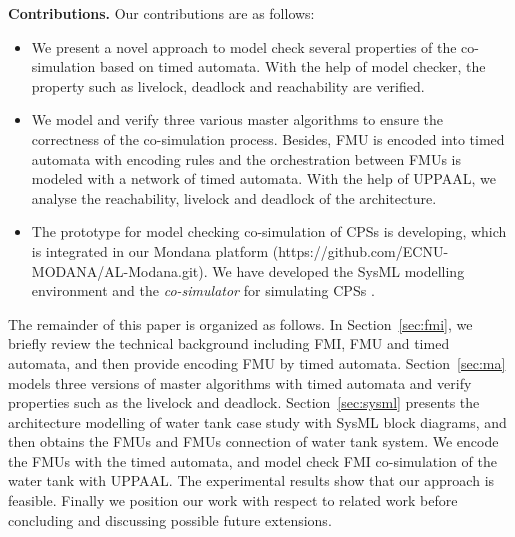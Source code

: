 \textbf{Contributions.} Our contributions are as follows:
\begin{itemize}
\item
We present a novel approach to model check several properties of the co-simulation based on timed automata. With the help of model checker, the property such as livelock, deadlock and reachability are verified. 
\item
We model and verify three various master algorithms to ensure the correctness of the co-simulation process. Besides, FMU is encoded into timed automata with encoding rules and the orchestration between FMUs is modeled with a network of timed automata. With the help of UPPAAL, we analyse the reachability, livelock and deadlock of the architecture.

\item
The prototype for model checking co-simulation of CPSs is developing, which is integrated in our Mondana platform \cite{Cheng2015Modana}(https://github.com/ECNU-MODANA/AL-Modana.git). We have developed the SysML modelling environment and the \textit{co-simulator} for simulating CPSs \cite{Fritzson1998Modelica}.
\end{itemize}
The remainder of this paper is organized as follows. In Section~\ref{sec:fmi}, we briefly review the technical background including FMI, FMU and timed automata, and then provide encoding FMU by timed automata.
Section~\ref{sec:ma} models three versions of master algorithms with timed automata and verify properties such as the livelock and deadlock.
Section~\ref{sec:sysml} presents the architecture modelling of water tank case study with SysML block diagrams, and then obtains the FMUs and FMUs connection of water tank system. We encode the FMUs with the timed automata, and model check FMI co-simulation of the water tank with UPPAAL. The experimental results show that our approach is feasible. Finally we position our work with respect to related work before concluding and discussing possible future extensions.




















